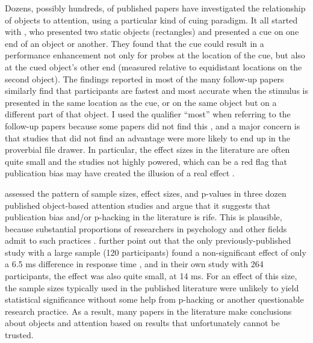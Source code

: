 \documentclass[
]{book}
\begin{document}
Dozens, possibly hundreds, of published papers have investigated the relationship of objects to attention, using a particular kind of cuing paradigm. It all started with \citet{eglyShiftingVisualAttention1994a}, who presented two static objects (rectangles) and presented a cue on one end of an object or another. They found that the cue could result in a performance enhancement not only for probes at the location of the cue, but also at the cued object's other end (measured relative to equidistant locations on the second object). The findings reported in most of the many follow-up papers similarly find that participants are fastest and most accurate when the stimulus is presented in the same location as the cue, or on the same object but on a different part of that object. I used the qualifier ``most'' when referring to the follow-up papers because some papers did not find this \citep{davisReversalObjectBased2005, shomsteinObjectbasedAttentionStrength2008, shomsteinObjectbasedAttentionSensory2002, louIndividualDifferencesTemporal2020}, and a major concern is that studies that did not find an advantage were more likely to end up in the proverbial file drawer. In particular, the effect sizes in the literature are often quite small and the studies not highly powered, which can be a red flag that publication bias may have created the illusion of a real effect \citep{buttonPowerFailureWhy2013}.

\citet{francisExcessSuccessArticles2021} assessed the pattern of sample sizes, effect sizes, and p-values in three dozen published object-based attention studies and argue that it suggests that publication bias and/or p-hacking in the literature is rife. This is plausible, because substantial proportions of researchers in psychology and other fields admit to such practices \citep{johnMeasuringPrevalenceQuestionable2012, rabeloQuestionableResearchPractices2020, chinQuestionableResearchPractices2021}. \citet{francisExcessSuccessArticles2021} further point out that the only previously-published study with a large sample (120 participants) found a non-significant effect of only a 6.5 ms difference in response time \citep{pilzHowPrevalentObjectBased2012}, and in their own study with 264 participants, the effect was also quite small, at 14 ms. For an effect of this size, the sample sizes typically used in the published literature were unlikely to yield statistical significance without some help from p-hacking or another questionable research practice. As a result, many papers in the literature make conclusions about objects and attention based on results that unfortunately cannot be trusted.
\end{document}

